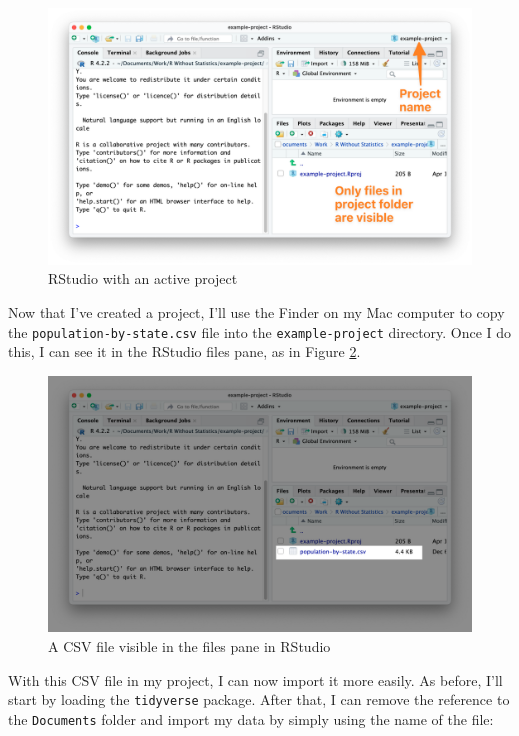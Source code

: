 \documentclass[
]{book}
\begin{document}
\begin{figure}
\includegraphics[width=1\linewidth]{assets/rstudio-active-project} \caption{RStudio with an active project}\label{fig:rstudio-active-project}
\end{figure}

Now that I've created a project, I'll use the Finder on my Mac computer to copy the \texttt{population-by-state.csv} file into the \texttt{example-project} directory. Once I do this, I can see it in the RStudio files pane, as in Figure \ref{fig:rstudio-project-csv}.

\begin{figure}
\includegraphics[width=1\linewidth]{assets/rstudio-project-csv} \caption{A CSV file visible in the files pane in RStudio}\label{fig:rstudio-project-csv}
\end{figure}

With this CSV file in my project, I can now import it more easily. As before, I'll start by loading the \texttt{tidyverse} package. After that, I can remove the reference to the \texttt{Documents} folder and import my data by simply using the name of the file:
\end{document}
